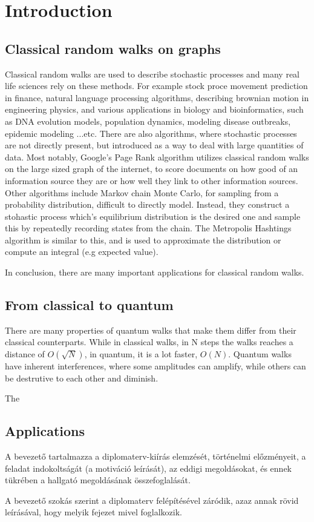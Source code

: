 \chapter{Introduction}

\section{Classical random walks on graphs}

Classical random walks are used to describe stochastic processes and many real life sciences rely on these methods. For example stock proce movement prediction in finance, natural language processing algorithms, describing brownian motion in engineering physics, and various applications in biology and bioinformatics, such as DNA evolution models, population dynamics, modeling disease outbreaks, epidemic modeling ...etc. There are also algorithms, where stochastic processes are not directly present, but introduced as a way to deal with large quantities of data. Most notably, Google's Page Rank algorithm utilizes classical random walks on the large sized graph of the internet, to score documents on how good of an information source they are or how well they link to other information sources. Other algorithms include Markov chain Monte Carlo, for sampling from a probability distribution, difficult to directly model. Instead, they construct a stohastic process which's equilibrium distribution is the desired one and sample this by repeatedly recording states from the chain. The Metropolis Hashtings algorithm is similar to this, and is used to approximate the distribution or compute an integral (e.g expected value).


In conclusion, there are many important applications for classical random walks.

\section{From classical to quantum}

There are many properties of quantum walks that make them differ from their classical counterparts. While in classical walks, in N steps the walks reaches a distance of $O(\sqrt{N})$, in quantum, it is a lot faster, $O(N)$. Quantum walks have inherent interferences, where some amplitudes can amplify, while others can be destrutive to each other and diminish.

The

\section{Applications}

A bevezető tartalmazza a diplomaterv-kiírás elemzését, történelmi előzményeit, a feladat indokoltságát (a motiváció leírását), az eddigi megoldásokat, és ennek tükrében a hallgató megoldásának összefoglalását.

A bevezető szokás szerint a diplomaterv felépítésével záródik, azaz annak rövid leírásával, hogy melyik fejezet mivel foglalkozik.
